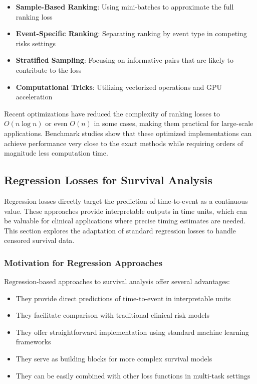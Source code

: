 \begin{itemize}
\item \textbf{Sample-Based Ranking}: Using mini-batches to approximate the full ranking loss
\item \textbf{Event-Specific Ranking}: Separating ranking by event type in competing risks settings
\item \textbf{Stratified Sampling}: Focusing on informative pairs that are likely to contribute to the loss
\item \textbf{Computational Tricks}: Utilizing vectorized operations and GPU acceleration
\end{itemize}

Recent optimizations have reduced the complexity of ranking losses to $O(n \log n)$ or even $O(n)$ in some cases, making them practical for large-scale applications. Benchmark studies show that these optimized implementations can achieve performance very close to the exact methods while requiring orders of magnitude less computation time.

\subsection{Regression Losses for Survival Analysis}

Regression losses directly target the prediction of time-to-event as a continuous value. These approaches provide interpretable outputs in time units, which can be valuable for clinical applications where precise timing estimates are needed. This section explores the adaptation of standard regression losses to handle censored survival data.

\subsubsection{Motivation for Regression Approaches}

Regression-based approaches to survival analysis offer several advantages:

\begin{itemize}
\item They provide direct predictions of time-to-event in interpretable units
\item They facilitate comparison with traditional clinical risk models
\item They offer straightforward implementation using standard machine learning frameworks
\item They serve as building blocks for more complex survival models
\item They can be easily combined with other loss functions in multi-task settings
\end{itemize}

